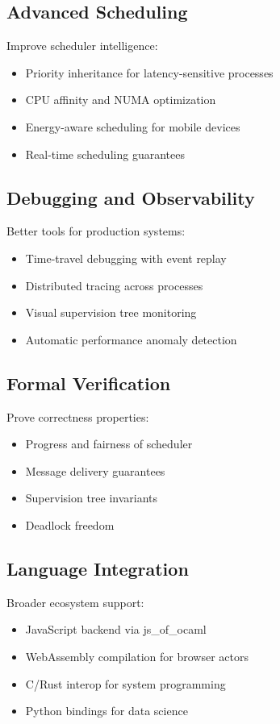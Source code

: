 \documentclass[12pt,a4paper]{report}
\begin{document}
\subsection{Advanced Scheduling}
Improve scheduler intelligence:
\begin{itemize}
\item Priority inheritance for latency-sensitive processes
\item CPU affinity and NUMA optimization
\item Energy-aware scheduling for mobile devices
\item Real-time scheduling guarantees
\end{itemize}

\subsection{Debugging and Observability}
Better tools for production systems:
\begin{itemize}
\item Time-travel debugging with event replay
\item Distributed tracing across processes
\item Visual supervision tree monitoring
\item Automatic performance anomaly detection
\end{itemize}

\subsection{Formal Verification}
Prove correctness properties:
\begin{itemize}
\item Progress and fairness of scheduler
\item Message delivery guarantees
\item Supervision tree invariants
\item Deadlock freedom
\end{itemize}

\subsection{Language Integration}
Broader ecosystem support:
\begin{itemize}
\item JavaScript backend via js_of_ocaml
\item WebAssembly compilation for browser actors
\item C/Rust interop for system programming
\item Python bindings for data science
\end{itemize}
\end{document}
